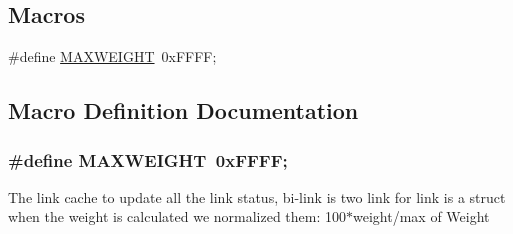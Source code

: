 \subsection*{Macros}
\begin{DoxyCompactItemize}
\item 
\#define \hyperlink{dsr-rcache_8h_a667684b091336e57674db9e4480b61b7}{M\+A\+X\+W\+E\+I\+G\+HT}~0x\+F\+F\+F\+F;
\end{DoxyCompactItemize}


\subsection{Macro Definition Documentation}
\subsubsection[{\texorpdfstring{M\+A\+X\+W\+E\+I\+G\+HT}{MAXWEIGHT}}]{\setlength{\rightskip}{0pt plus 5cm}\#define M\+A\+X\+W\+E\+I\+G\+HT~0x\+F\+F\+F\+F;}\hypertarget{dsr-rcache_8h_a667684b091336e57674db9e4480b61b7}{}\label{dsr-rcache_8h_a667684b091336e57674db9e4480b61b7}
The link cache to update all the link status, bi-\/link is two link for link is a struct when the weight is calculated we normalized them\+: 100$\ast$weight/max of Weight 